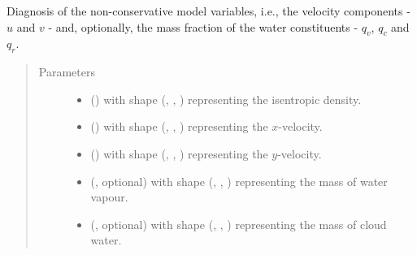 \documentclass[letterpaper,10pt,english]{sphinxmanual}
\begin{document}
\begin{fulllineitems}
\begin{fulllineitems}
\label{\detokenize{api:dycore.diagnostic_isentropic.DiagnosticIsentropic.get_nonconservative_variables}}
Diagnosis of the non-conservative model variables, i.e., the velocity components - \(u\) and \(v\) -
and, optionally, the mass fraction of the water constituents - \(q_v\), \(q_c\) and \(q_r\).
\begin{quote}\begin{description}
\item[{Parameters}] \leavevmode\begin{itemize}
\item {} 
 () \textendash{}  with shape (, , ) representing the isentropic density.

\item {} 
 () \textendash{}  with shape (, , ) representing the \(x\)-velocity.

\item {} 
 () \textendash{}  with shape (, , ) representing the \(y\)-velocity.

\item {} 
 (, optional) \textendash{}  with shape (, , ) representing the mass of water vapour.

\item {} 
 (, optional) \textendash{}  with shape (, , ) representing the mass of cloud water.


\end{itemize}
\end{description}
\end{quote}
\end{fulllineitems}
\end{fulllineitems}
\end{document}
